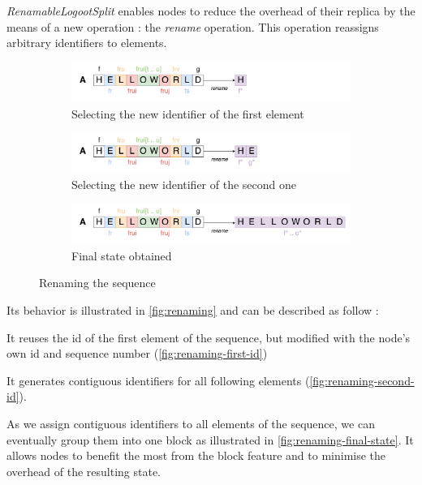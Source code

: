 \documentclass[sigplan,10pt]{acmart}
\begin{document}
\emph{RenamableLogootSplit} enables nodes to reduce the overhead of their replica by the means of a new operation : the \emph{rename} operation.
This operation reassigns arbitrary identifiers to elements.

\begin{figure}
    \centering
    \begin{subfigure}{0.45\textwidth}
        \includegraphics[width=1\textwidth]{img/renaming-first-id.png}
        \caption{Selecting the new identifier of the first element}
        \label{fig:renaming-first-id}
    \end{subfigure}
    \begin{subfigure}{0.45\textwidth}
        \includegraphics[width=1\textwidth]{img/renaming-second-id.png}
        \caption{Selecting the new identifier of the second one}
        \label{fig:renaming-second-id}
    \end{subfigure}
    \begin{subfigure}{0.45\textwidth}
        \includegraphics[width=1\textwidth]{img/renaming-final-state.png}
        \caption{Final state obtained}
        \label{fig:renaming-final-state}
    \end{subfigure}
    \caption{Renaming the sequence}
    \label{fig:renaming}
\end{figure}

Its behavior is illustrated in \autoref{fig:renaming} and can be described as follow :
\begin{enumerate*}
    \item It reuses the id of the first element of the sequence, but modified with the node's own id and sequence number (\autoref{fig:renaming-first-id})
    \item It generates contiguous identifiers for all following elements (\autoref{fig:renaming-second-id}).
\end{enumerate*}
As we assign contiguous identifiers to all elements of the sequence, we can eventually group them into one block as illustrated in \autoref{fig:renaming-final-state}.
It allows nodes to benefit the most from the block feature and to minimise the overhead of the resulting state.
\end{document}
